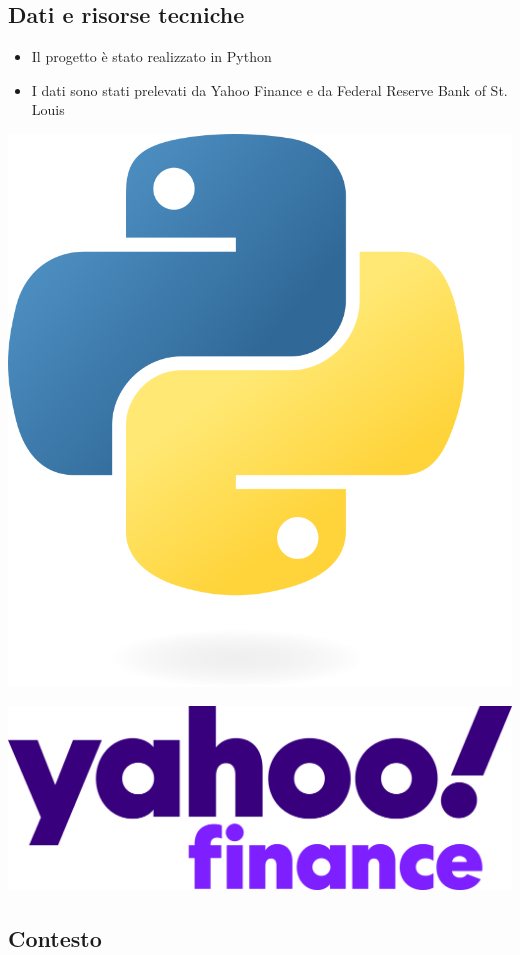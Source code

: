 \documentclass[compress]{beamer}
\begin{document}
\subsection{Dati e risorse tecniche}
\begin{frame}{\subsecname}
	\begin{itemize}
		\item Il progetto è stato realizzato in Python
		\item I dati sono stati prelevati da Yahoo Finance e da Federal Reserve Bank of St. Louis
	\end{itemize}
	\vspace{0.5cm}
	\begin{minipage}{0.3\textwidth}
		\centering
		\includegraphics[width=0.5\linewidth]{images/Python-logo.png}
	\end{minipage}
	\begin{minipage}{0.3\textwidth}
		\centering
		\includegraphics[width=0.7\linewidth]{images/Yahoo!_Finance_logo.png}
	\end{minipage}
	\begin{minipage}{0.3\textwidth}
		\centering
		
	\end{minipage}
\end{frame}

\subsection{Contesto}
\end{document}
